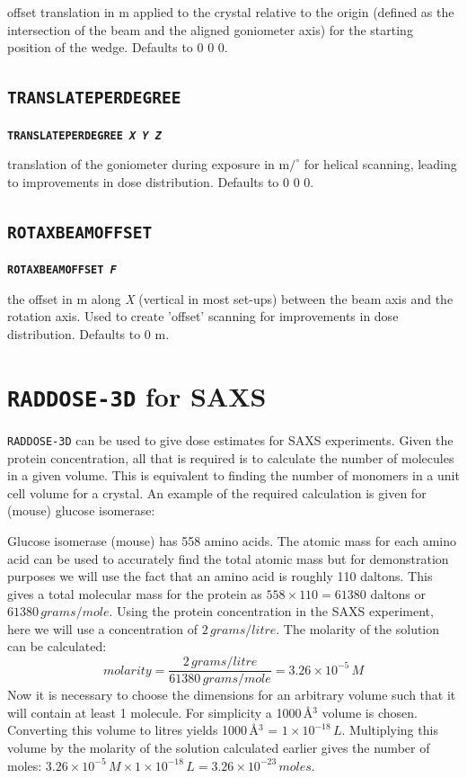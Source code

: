 \documentclass[a4paper]{article}
\newcommand{\RD}{\texttt{RADDOSE-3D}\xspace}
\newcommand{\Keyword}[1]{\texttt{\textbf{#1}}\xspace}
\begin{document}
offset translation in \hbox{\textmu}m applied to the crystal relative to the origin (defined as the intersection of the beam and the aligned goniometer axis) for the starting position of the wedge. Defaults to 0 0 0.



\subsection{\Keyword{TRANSLATEPERDEGREE}}

\noindent \Keyword{TRANSLATEPERDEGREE \textit{X Y Z}}

translation of the goniometer during exposure in \hbox{\textmu}m$/^{\circ}$ for helical scanning, leading to improvements in dose distribution. Defaults to 0 0 0.



\subsection{\Keyword{ROTAXBEAMOFFSET}}

\noindent \Keyword{ROTAXBEAMOFFSET \textit{F}}

the offset in \hbox{\textmu}m along \textit{X} (vertical in most set-ups) between the beam axis and the rotation axis. Used to create 'offset' scanning for improvements in dose distribution. Defaults to 0 \hbox{\textmu}m.

\newpage

\section{\RD for SAXS}

\RD can be used to give dose estimates for SAXS experiments. Given the protein concentration, all that is required is to calculate the number of molecules in a given volume. This is equivalent to finding the number of monomers in a unit cell volume for a crystal. An example of the required calculation is given for (mouse) glucose isomerase:

Glucose isomerase (mouse) has 558 amino acids. The atomic mass for each amino acid can be used to accurately find the total atomic mass but for demonstration purposes we will use the fact that an amino acid is roughly 110 daltons. This gives a total molecular mass for the protein as $558 \times 110 = 61380$ daltons or $61380\,grams/mole$. Using the protein concentration in the SAXS experiment, here we will use a concentration of $2\,grams/litre$. The molarity of the solution can be calculated: 
\begin{equation}
molarity = \frac{2\,grams/litre}{61380\,grams/mole} = 3.26 \times 10^{-5}\,M
\end{equation} 
Now it is necessary to choose the dimensions for an arbitrary volume such that it will contain at least 1 molecule.
For simplicity a 1000\,\AA$^3$ volume is chosen. Converting this volume to litres yields 1000\,\AA$^3$ = $1 \times 10^{-18}\,L$. Multiplying this volume by the molarity of the solution calculated earlier gives the number of moles: $3.26 \times 10^{-5}\,M \times 1 \times 10^{-18}\,L = 3.26 \times 10^{-23}\,moles$.
\end{document}
